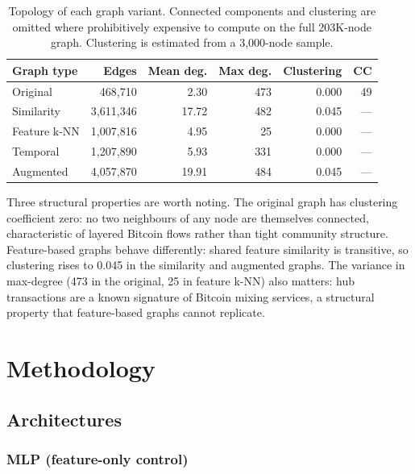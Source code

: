 \begin{table}[!htbp]
\centering
\caption{Topology of each graph variant.  Connected components and
clustering are omitted where prohibitively expensive to compute on the
full 203K-node graph.  Clustering is estimated from a 3,000-node sample.}
\label{tab:graph_stats}
\small
\begin{tabular}{lrrrrr}
\toprule
\textbf{Graph type} & \textbf{Edges} & \textbf{Mean deg.}
  & \textbf{Max deg.} & \textbf{Clustering} & \textbf{CC} \\
\midrule
Original    &    468,710 &  2.30 & 473 & 0.000 & 49 \\
Similarity  &  3,611,346 & 17.72 & 482 & 0.045 & ---\\
Feature k-NN & 1,007,816 &  4.95 &  25 & 0.000 & ---\\
Temporal    &  1,207,890 &  5.93 & 331 & 0.000 & ---\\
Augmented   &  4,057,870 & 19.91 & 484 & 0.045 & ---\\
\bottomrule
\end{tabular}
\end{table}

Three structural properties are worth noting.  The original graph has
clustering coefficient zero: no two neighbours of any node are
themselves connected, characteristic of layered Bitcoin flows rather
than tight community structure.  Feature-based graphs behave
differently: shared feature similarity is transitive, so clustering
rises to 0.045 in the similarity and augmented graphs.  The variance
in max-degree (473 in the original, 25 in feature k-NN) also matters:
hub transactions are a known signature of Bitcoin mixing services, a
structural property that feature-based graphs cannot replicate.


\section{Methodology}
\label{sec:methods}

\subsection{Architectures}

\subsubsection{MLP (feature-only control)}

